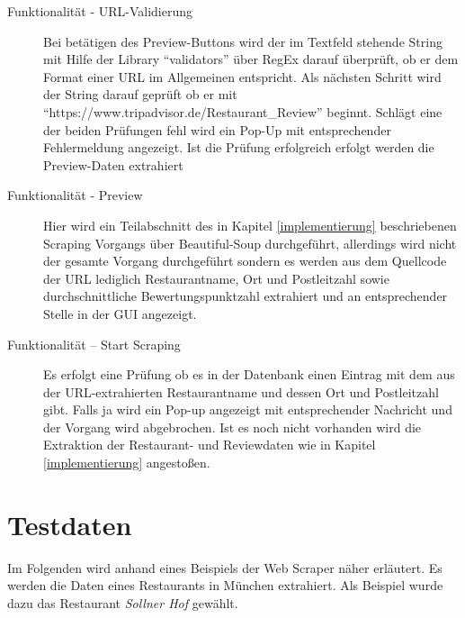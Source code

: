 \documentclass[a4paper,oneside,12pt]{report}
\begin{document}
            
            \begin{description}
            \item[Funktionalität - URL-Validierung] Bei betätigen des Preview-Buttons wird der im Textfeld stehende String mit Hilfe der Library ``validators'' über RegEx darauf überprüft, ob er dem Format einer URL im Allgemeinen entspricht. Als nächsten Schritt wird der String darauf geprüft ob er mit\\ ``https://www.tripadvisor.de/Restaurant\_Review'' beginnt. Schlägt eine der beiden Prüfungen fehl wird ein Pop-Up mit entsprechender Fehlermeldung angezeigt. Ist die Prüfung erfolgreich erfolgt werden die Preview-Daten extrahiert
            \item[Funktionalität - Preview] Hier wird ein Teilabschnitt des in Kapitel \ref{implementierung} beschriebenen Scraping Vorgangs über Beautiful-Soup durchgeführt, allerdings wird nicht der gesamte Vorgang durchgeführt sondern es werden aus dem Quellcode der URL lediglich Restaurantname, Ort und Postleitzahl sowie durchschnittliche Bewertungspunktzahl extrahiert und an entsprechender Stelle in der GUI angezeigt.
            \item[Funktionalität – Start Scraping]Es erfolgt eine Prüfung ob es in der Datenbank einen Eintrag mit dem aus der URL-extrahierten Restaurantname und dessen Ort und Postleitzahl gibt. Falls ja wird ein Pop-up angezeigt mit entsprechender Nachricht und der Vorgang wird abgebrochen. Ist es noch nicht vorhanden wird die Extraktion der Restaurant- und Reviewdaten wie in Kapitel \ref{implementierung} angestoßen.




            \end{description}
	
	\chapter[Testdaten - Johanna Sickendiek]{Testdaten}
	
		Im Folgenden wird anhand eines Beispiels der Web Scraper näher erläutert. Es werden die Daten eines Restaurants in München extrahiert. Als Beispiel wurde dazu das Restaurant \textit{Sollner Hof} gewählt.
	
\end{document}
